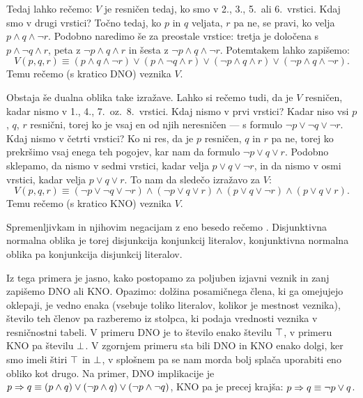 		Tedaj lahko rečemo: $V$ je resničen tedaj, ko smo v 2., 3., 5.~ali 6.~vrstici. Kdaj smo v drugi vrstici? Točno tedaj, ko $p$ in $q$ veljata, $r$ pa ne, se pravi, ko velja $p \land q \land \lnot{r}$. Podobno naredimo še za preostale vrstice: tretja je določena s $p \land \lnot{q} \land r$, peta z $\lnot{p} \land q \land r$ in šesta z $\lnot{p} \land q \land \lnot{r}$. Potemtakem lahko zapišemo:
		\[V(p, q, r) \equiv (p \land q \land \lnot{r}) \lor (p \land \lnot{q} \land r) \lor (\lnot{p} \land q \land r) \lor (\lnot{p} \land q \land \lnot{r}).\]
		Temu rečemo  (s kratico DNO) veznika $V$.
		
		Obstaja še dualna oblika take izražave. Lahko si rečemo tudi, da je $V$ resničen, kadar nismo v 1., 4., 7.~oz.~8.~vrstici. Kdaj nismo v prvi vrstici? Kadar niso vsi $p$, $q$, $r$ resnični, torej ko je vsaj en od njih neresničen --- s formulo $\lnot{p} \lor \lnot{q} \lor \lnot{r}$. Kdaj nismo v četrti vrstici? Ko ni res, da je $p$ resničen, $q$ in $r$ pa ne, torej ko prekršimo vsaj enega teh pogojev, kar nam da formulo $\lnot{p} \lor q \lor r$. Podobno sklepamo, da nismo v sedmi vrstici, kadar velja $p \lor q \lor \lnot{r}$, in da nismo v osmi vrstici, kadar velja $p \lor q \lor r$. To nam da sledečo izražavo za $V$:
		\[V(p, q, r) \equiv (\lnot{p} \lor \lnot{q} \lor \lnot{r}) \land (\lnot{p} \lor q \lor r) \land (p \lor q \lor \lnot{r}) \land (p \lor q \lor r).\]
		Temu rečemo  (s kratico KNO) veznika $V$.
		
		Spremenljivkam in njihovim negacijam z eno besedo rečemo . Disjunktivna normalna oblika je torej disjunkcija konjunkcij literalov, konjunktivna normalna oblika pa konjunkcija disjunkcij literalov.
		
		Iz tega primera je jasno, kako postopamo za poljuben izjavni veznik in zanj zapišemo DNO ali KNO. Opazimo: dolžina posamičnega člena, ki ga omejujejo oklepaji, je vedno enaka (vsebuje toliko literalov, kolikor je mestnost veznika), število teh členov pa razberemo iz stolpca, ki podaja vrednosti veznika v resničnostni tabeli. V primeru DNO je to število enako številu $\top$, v primeru KNO pa številu $\bot$. V zgornjem primeru sta bili DNO in KNO enako dolgi, ker smo imeli štiri $\top$ in $\bot$, v splošnem pa se nam morda bolj splača uporabiti eno obliko kot drugo. Na primer, DNO implikacije je $p \Rightarrow q \equiv (p \land q) \lor (\lnot{p} \land q) \lor (\lnot{p} \land \lnot{q})$, KNO pa je precej krajša: $p \Rightarrow q \equiv \lnot{p} \lor q$.
		
